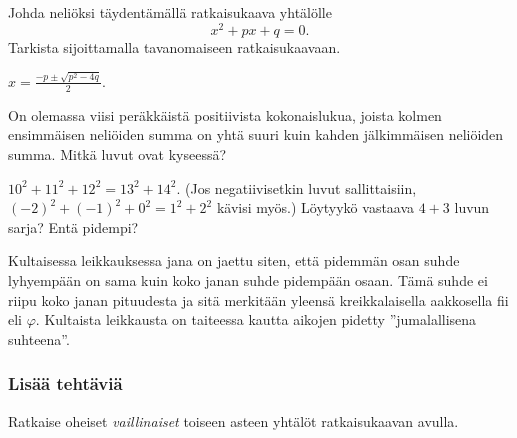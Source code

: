 \begin{tehtavasivu}
\begin{tehtava}
	Johda neliöksi täydentämällä ratkaisukaava yhtälölle
	\[ x^2 +px+q=0. \]
	Tarkista sijoittamalla tavanomaiseen ratkaisukaavaan.
	\begin{vastaus}
		$x=\frac{-p \pm \sqrt{p^2-4q}}{2}$.
	\end{vastaus}
\end{tehtava}

\begin{tehtava} %
On olemassa viisi peräkkäistä positiivista kokonaislukua, joista kolmen ensimmäisen neliöiden summa on yhtä suuri kuin kahden jälkimmäisen neliöiden summa. Mitkä luvut ovat kyseessä?
    \begin{vastaus}
		$10^2+11^2+12^2 = 13^2 + 14^2$.
    	(Jos negatiivisetkin luvut sallittaisiin, $(-2)^2+(-1)^2+0^2 = 1^2 + 2^2$ kävisi myös.) Löytyykö vastaava $4 + 3$ luvun sarja? Entä pidempi?
    \end{vastaus}
\end{tehtava}

\begin{tehtava}
    Kultaisessa leikkauksessa jana on jaettu siten, että pidemmän osan suhde lyhyempään on sama kuin koko janan suhde pidempään osaan. Tämä suhde ei riipu koko janan pituudesta ja sitä merkitään yleensä kreikkalaisella aakkosella fii eli $\varphi$. Kultaista leikkausta on taiteessa kautta aikojen pidetty ''jumalallisena suhteena''. %
    \begin{vastaus}
    \end{vastaus}
\end{tehtava}

\subsubsection*{Lisää tehtäviä}

\begin{tehtava}
    Ratkaise oheiset \textit{vaillinaiset} toiseen asteen yhtälöt ratkaisukaavan avulla.
    \begin{vastaus}
    \end{vastaus}
\end{tehtava}


\end{tehtavasivu}
